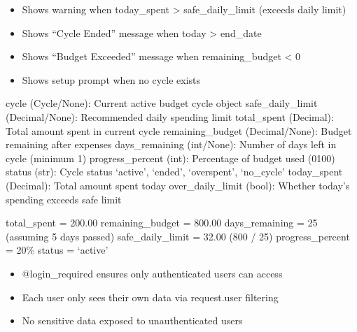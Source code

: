\documentclass[letterpaper,10pt,english]{sphinxmanual}
\begin{document}
\begin{fulllineitems}
\begin{description}
\begin{itemize}
\end{itemize}

\begin{itemize}
\item {} 
\sphinxAtStartPar
Shows warning when today\_spent \textgreater{} safe\_daily\_limit (exceeds daily limit)

\item {} 
\sphinxAtStartPar
Shows “Cycle Ended” message when today \textgreater{} end\_date

\item {} 
\sphinxAtStartPar
Shows “Budget Exceeded” message when remaining\_budget \textless{} 0

\item {} 
\sphinxAtStartPar
Shows setup prompt when no cycle exists

\end{itemize}

\sphinxAtStartPar
cycle (Cycle/None): Current active budget cycle object
safe\_daily\_limit (Decimal/None): Recommended daily spending limit
total\_spent (Decimal): Total amount spent in current cycle
remaining\_budget (Decimal/None): Budget remaining after expenses
days\_remaining (int/None): Number of days left in cycle (minimum 1)
progress\_percent (int): Percentage of budget used (0\sphinxhyphen{}100)
status (str): Cycle status \sphinxhyphen{} ‘active’, ‘ended’, ‘overspent’, ‘no\_cycle’
today\_spent (Decimal): Total amount spent today
over\_daily\_limit (bool): Whether today’s spending exceeds safe limit

\begin{description}
\sphinxAtStartPar
total\_spent = 200.00
remaining\_budget = 800.00
days\_remaining = 25 (assuming 5 days passed)
safe\_daily\_limit = 32.00 (800 / 25)
progress\_percent = 20\%
status = ‘active’

\end{description}

\begin{itemize}
\item {} 
\sphinxAtStartPar
@login\_required ensures only authenticated users can access

\item {} 
\sphinxAtStartPar
Each user only sees their own data via request.user filtering

\item {} 
\sphinxAtStartPar
No sensitive data exposed to unauthenticated users


\end{itemize}
\end{description}
\end{fulllineitems}
\end{document}
